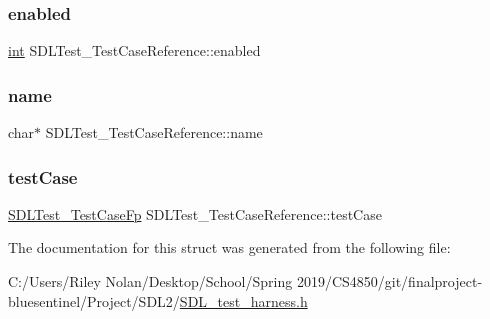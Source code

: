 \mbox{\label{struct_s_d_l_test___test_case_reference_a15168c85e38cae7557b4beb477ef6f9a}} 
\subsubsection{\texorpdfstring{enabled}{enabled}}
{\footnotesize\ttfamily \mbox{\hyperlink{warnings_8h_a74f207b5aa4ba51c3a2ad59b219a423b}{int}} S\+D\+L\+Test\+\_\+\+Test\+Case\+Reference\+::enabled}

\mbox{\label{struct_s_d_l_test___test_case_reference_aabd588c915c52fb13bcd0c71e071a604}} 
\subsubsection{\texorpdfstring{name}{name}}
{\footnotesize\ttfamily char$\ast$ S\+D\+L\+Test\+\_\+\+Test\+Case\+Reference\+::name}

\mbox{\label{struct_s_d_l_test___test_case_reference_af9472f0c421a2845b540fc28fb30a3ef}} 
\subsubsection{\texorpdfstring{testCase}{testCase}}
{\footnotesize\ttfamily \mbox{\hyperlink{_s_d_l__test__harness_8h_ae1a62d8f725d57dc95faddcc5409afbb}{S\+D\+L\+Test\+\_\+\+Test\+Case\+Fp}} S\+D\+L\+Test\+\_\+\+Test\+Case\+Reference\+::test\+Case}



The documentation for this struct was generated from the following file\+:\begin{DoxyCompactItemize}
\item 
C\+:/\+Users/\+Riley Nolan/\+Desktop/\+School/\+Spring 2019/\+C\+S4850/git/finalproject-\/bluesentinel/\+Project/\+S\+D\+L2/\mbox{\hyperlink{_s_d_l__test__harness_8h}{S\+D\+L\+\_\+test\+\_\+harness.\+h}}\end{DoxyCompactItemize}
